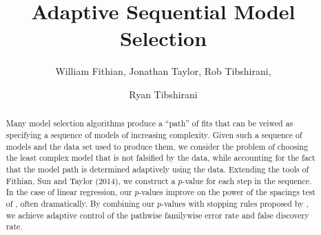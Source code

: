 \documentclass{article}
\begin{document}
\newtheorem{theorem}{Theorem}
\newtheorem{corollary}[theorem]{Corollary}
\newtheorem{lemma}[theorem]{Lemma}
\newtheorem{observation}[theorem]{Observation}
\newtheorem{proposition}[theorem]{Proposition}
\newtheorem{definition}[theorem]{Definition}
\newtheorem{claim}[theorem]{Claim}
\newtheorem{fact}[theorem]{Fact}
\newtheorem{assumption}[theorem]{Assumption}
\newtheorem{model}[theorem]{Model}

\theoremstyle{definition}
\newtheorem{example}{Example}

\newcommand{\cM}{\mathcal{M}}
\newcommand{\cH}{\mathcal{H}}
\newcommand{\cD}{\mathcal{D}}
\newcommand{\FDR}{\textnormal{FDR}}
\newcommand{\FCR}{\textnormal{FCR}}
\newcommand{\crt}{\phi}
\newcommand{\M}{\mathcal{M}}
\newcommand{\cY}{\mathcal{Y}}
\newcommand{\cX}{\mathcal{X}}
\newcommand{\cV}{\mathcal{V}}
\newcommand{\bX}{\mathbf{X}}
\newcommand{\x}{\mathbf{x}}
\newcommand{\Gv}{\;\;\big|\;\;}
\newcommand{\proj}{\cP}
\newcommand{\pow}{\text{Pow}}
\newcommand{\sF}{\mathscr{F}}
\newcommand{\cF}{\mathcal{F}}
\newcommand{\sC}{\mathscr{C}}
\newcommand{\hJ}{\widehat{J}}
\newcommand{\bH}{\mathbf{H}}
\newcommand{\bM}{\mathbf{M}}
\newcommand{\tM}{\widetilde{M}}
\newcommand{\tE}{\widetilde{E}}
\newcommand{\hK}{\widehat{K}}
\newcommand{\hk}{\hat{k}}
\newcommand{\leqAS}{\overset{\textrm{a.s.}}{\leq}}


\newcommand*\mystrut{\vrule width0pt height0pt depth1.5ex\relax}
\newcommand{\underlabel}{\underbracket[1pt][.5pt]{\mystrut \quad\;\; \sub \quad\;\; }}
\newcommand{\JTcomment}[1]{{\color{blue}{(JT: \bf \sc #1) }}}
\newcommand{\WFcomment}[1]{{\color{red}{(WF: \bf \sc #1) }}}

\title{Adaptive Sequential Model Selection}
\author{William Fithian, Jonathan Taylor, Rob Tibshirani, \and Ryan Tibshirani}
\maketitle

\begin{abstract}
  Many model selection algorithms produce a ``path'' of fits that can be veiwed as specifying a sequence of models of increasing complexity. Given such a sequence of models and the data set used to produce them, we consider the problem of choosing the least complex model that is not falsified by the data, while accounting for the fact that the model path is determined adaptively using the data. Extending the tools of Fithian, Sun and Taylor (2014), we construct a $p$-value for each step in the sequence. In the case of linear regression, our $p$-values improve on the power of the spacings test of \citet{taylor2014exact}, often dramatically. By combining our $p$-values with stopping rules proposed by \citet{gsell2013sequential}, we achieve adaptive control of the pathwise familywise error rate and false discovery rate.
\end{abstract}
\end{document}
